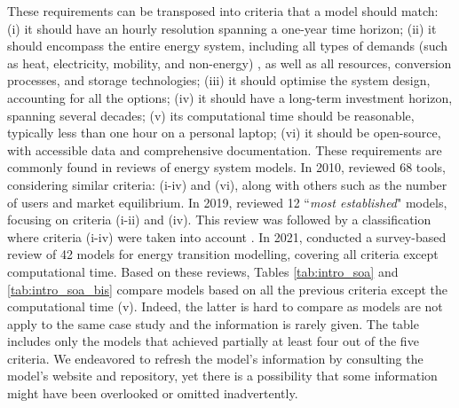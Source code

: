 These requirements can be transposed into criteria that a model should match:
(i) it should have an hourly resolution spanning a one-year time horizon;
(ii) it should encompass the entire energy system, including all types of demands (such as heat, electricity, mobility, and non-energy)
, as well as all resources, conversion processes, and storage technologies;
(iii) it should optimise the system design, accounting for all the options;
(iv) it should have a long-term investment horizon, spanning several decades;
(v) its computational time should be reasonable, typically less than one hour on a personal laptop;
(vi) it should be open-source, with accessible data and comprehensive documentation.
These requirements are commonly found in reviews of energy system models. In 2010, \citet{Connolly2010} reviewed 68 tools, considering similar criteria: (i-iv) and (vi), along with others such as the number of users and market equilibrium. In 2019, \citet{prina2019transition} reviewed 12 ``\emph{most established}" models, focusing on criteria (i-ii) and (iv). This review was followed by a classification where criteria (i-iv) were taken into account \cite{prina2020classification}. In 2021, \citet{chang2021trends} conducted a survey-based review of 42 models for energy transition modelling, covering all criteria except computational time.
Based on these reviews, Tables \ref{tab:intro_soa} and \ref{tab:intro_soa_bis} compare models based on all the previous criteria except the computational time (v). Indeed, the latter is hard to compare as models are not apply to the same case study and the information is rarely given. The table includes only the models that achieved partially at least four out of the five criteria. We endeavored to refresh the model's information by consulting the model's website and repository, yet there is a possibility that some information might have been overlooked or omitted inadvertently.

